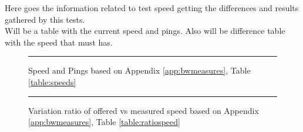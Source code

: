 Here goes the information related to test speed getting the differences and results gathered by this tests.\\

Will be a table with the current speed and pings. Also will be difference table with the speed that must has.\\

\begin{figure}[h]
\begin{minipage}{6cm}
\centering
	\rule{5.5cm}{7.1cm}
\caption{Speed and Pings based on Appendix \ref{app:bwmeasures}, Table \ref{table:speeds}}
\label{fig:speeds}
\end{minipage}%
\end{figure}%

\begin{figure}[h]
\begin{minipage}{6cm}
\centering
	\rule{5.5cm}{7.1cm}
\caption{Variation ratio of offered vs measured speed based on Appendix \ref{app:bwmeasures}, Table \ref{table:ratiospeed}}
\label{fig:ratiospeeds}
\end{minipage}%
\end{figure}%

